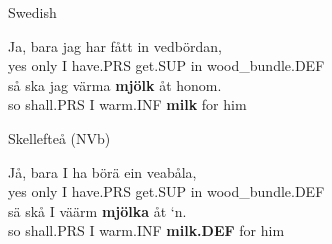 
\item 


\item 

Swedish



 \ea\label{}
\gll Ja,  bara  jag  har  fått  in  vedbördan,\\


yes  only  I  have.PRS  get.SUP  in  wood\_bundle.DEF\\

 \ea\label{}
\gll så  ska  jag  värma  \textbf{mjölk} åt  honom.\\


so  shall.PRS  I  warm.INF  \textbf{milk} for  him\\

\item 

\label{bkm:Ref110672187}Skellefteå (NVb)



 \ea\label{}
\gll Jå,  bara  I  ha  börä  ein  veabåla,\\


yes  only  I  have.PRS  get.SUP  in  wood\_bundle.DEF\\

 \ea\label{}
\gll sä  skå  I  väärm  \textbf{mjölka} åt  ‘n.\\


so  shall.PRS  I  warm.INF  \textbf{milk.DEF} for  him\\

\item 

